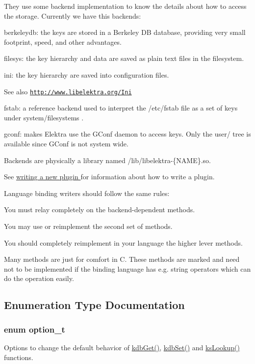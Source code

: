 They use some backend implementation to know the details about how to access the storage. Currently we have this backends:
\begin{DoxyItemize}
\item {\ttfamily berkeleydb:} the keys are stored in a Berkeley DB database, providing very small footprint, speed, and other advantages.
\item {\ttfamily filesys:} the key hierarchy and data are saved as plain text files in the filesystem.
\item {\ttfamily ini:} the key hierarchy are saved into configuration files. \begin{DoxySeeAlso}{See also}
\href{http://www.libelektra.org/Ini}{\tt http://www.libelektra.org/Ini}
\end{DoxySeeAlso}

\item {\ttfamily fstab:} a reference backend used to interpret the {\ttfamily /etc/fstab} file as a set of keys under {\ttfamily system/filesystems} .
\item {\ttfamily gconf:} makes Elektra use the GConf daemon to access keys. Only the {\ttfamily user/} tree is available since GConf is not system wide.
\end{DoxyItemize}

Backends are physically a library named {\ttfamily /lib/libelektra-\/\{NAME\}}.so.

See \hyperlink{group__plugin}{writing a new plugin } for information about how to write a plugin.

Language binding writers should follow the same rules:
\begin{DoxyItemize}
\item You must relay completely on the backend-\/dependent methods.
\item You may use or reimplement the second set of methods.
\item You should completely reimplement in your language the higher lever methods.
\item Many methods are just for comfort in C. These methods are marked and need not to be implemented if the binding language has e.g. string operators which can do the operation easily. 
\end{DoxyItemize}

\subsection{Enumeration Type Documentation}
\hypertarget{group__kdb_ga98a3d6a4016c9dad9cbd1a99a9c2a45a}{
\subsubsection[{option\_\-t}]{\setlength{\rightskip}{0pt plus 5cm}enum {\bf option\_\-t}}}
\label{group__kdb_ga98a3d6a4016c9dad9cbd1a99a9c2a45a}
Options to change the default behavior of \hyperlink{group__kdb_ga28e385fd9cb7ccfe0b2f1ed2f62453a1}{kdbGet()}, \hyperlink{group__kdb_ga11436b058408f83d303ca5e996832bcf}{kdbSet()} and \hyperlink{group__keyset_gaa34fc43a081e6b01e4120daa6c112004}{ksLookup()} functions.

